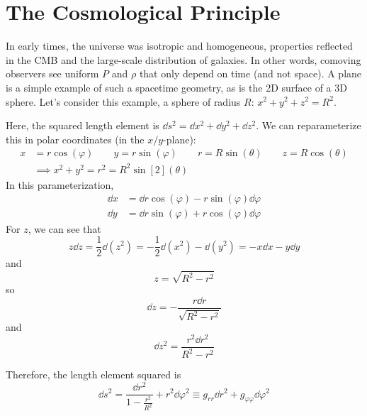 \documentclass[a4paper,twoside,master.tex]{subfiles}
\begin{document}


\section{The Cosmological Principle}\label{sec:the_cosmological_principle}

In early times, the universe was isotropic and homogeneous, properties reflected in the CMB and the large-scale distribution of galaxies. In other words, comoving observers see uniform $ P $ and $ \rho $ that only depend on time (and not space). A plane is a simple example of such a spacetime geometry, as is the 2D surface of a 3D sphere. Let's consider this example, a sphere of radius $ R $: $ x^2 + y^2 + z^2 = R^2 $. 

Here, the squared length element is $ \dd{s}^2 = \dd{x}^2 + \dd{y}^2 + \dd{z}^2 $. We can reparameterize this in polar coordinates (in the $ x/y $-plane):
\begin{align}
    x &= r \cos(\varphi) \qquad y = r \sin(\varphi) \qquad r = R \sin(\theta) \qquad z = R \cos(\theta) \\
      &\implies x^2 + y^2 = r^2 = R^2 \sin[2](\theta)
\end{align}
In this parameterization,
\begin{align}
    \dd{x} &= \dd{r} \cos(\varphi) - r \sin(\varphi) \dd{\varphi} \\
    \dd{y} &= \dd{r} \sin(\varphi) + r \cos(\varphi) \dd{\varphi}
\end{align}
For $ z $, we can see that
\begin{equation}
    z \dd{z} = \frac{1}{2} \dd{(z^2)} = - \frac{1}{2} \dd{(x^2)} - \dd{(y^2)} = - x \dd{x} - y \dd{y}
\end{equation}
and
\begin{equation}
    z = \sqrt{R^2 - r^2}
\end{equation}
so
\begin{equation}
    \dd{z} = - \frac{r \dd{r}}{\sqrt{R^2 - r^2}}
\end{equation}
and
\begin{equation}
    \dd{z}^2 = \frac{r^2 \dd{r}^2}{R^2 - r^2}
\end{equation}

Therefore, the length element squared is
\begin{equation}
    \dd{s}^2 = \frac{\dd{r}^2}{1 - \frac{r^2}{R^2}} + r^2 \dd{\varphi}^2 \equiv g_{rr} \dd{r^2} + g_{\varphi \varphi} \dd{\varphi}^2
\end{equation}
\end{document}
